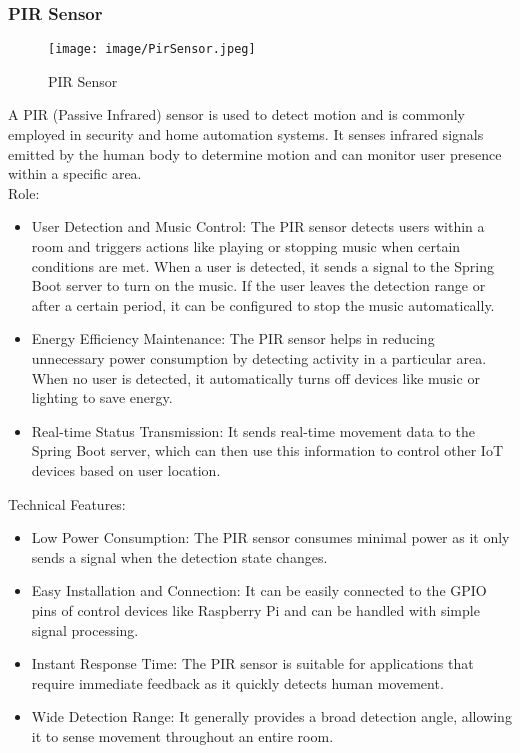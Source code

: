 \documentclass[conference]{IEEEtran}
\begin{document}
\subsubsection{PIR Sensor}

\begin{figure}[h!]
    \centering
    \texttt{[image: image/PirSensor.jpeg]}
    \caption{PIR Sensor}
    \label{fig:enter-label}
\end{figure}
\noindent A PIR (Passive Infrared) sensor is used to detect motion and is commonly employed in security and home automation systems. It senses infrared signals emitted by the human body to determine motion and can monitor user presence within a specific area.\\

Role:
\begin{itemize}
    \item User Detection and Music Control: The PIR sensor detects users within a room and triggers actions like playing or stopping music when certain conditions are met. When a user is detected, it sends a signal to the Spring Boot server to turn on the music. If the user leaves the detection range or after a certain period, it can be configured to stop the music automatically.\\
    \item Energy Efficiency Maintenance: The PIR sensor helps in reducing unnecessary power consumption by detecting activity in a particular area. When no user is detected, it automatically turns off devices like music or lighting to save energy.\\
    \item Real-time Status Transmission: It sends real-time movement data to the Spring Boot server, which can then use this information to control other IoT devices based on user location.\\
\end{itemize}

Technical Features:
\begin{itemize}
    \item Low Power Consumption: The PIR sensor consumes minimal power as it only sends a signal when the detection state changes.\\
    \item Easy Installation and Connection: It can be easily connected to the GPIO pins of control devices like Raspberry Pi and can be handled with simple signal processing.\\
    \item Instant Response Time: The PIR sensor is suitable for applications that require immediate feedback as it quickly detects human movement.\\
    \item Wide Detection Range: It generally provides a broad detection angle, allowing it to sense movement throughout an entire room.\\
\end{itemize}
\end{document}
